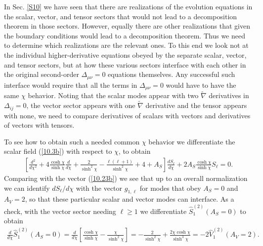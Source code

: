 \documentclass[aps,onecolumn,10pt]{revtex4}
\numberwithin{equation}{section}
\numberwithin{equation}{section}
\begin{document}
In Sec. \ref{S10} we have seen that there are realizations of the evolution equations in the scalar, vector, and tensor sectors that would not lead to a decomposition theorem in those sectors. However, equally there are other realizations that given the boundary conditions would lead to a decomposition theorem. Thus we need to determine which realizations are the relevant ones. To this end we look not at the individual higher-derivative equations obeyed by the separate scalar, vector, and tensor sectors, but at how these various sectors interface with each other in the original second-order $\Delta_{\mu\nu}=0$ equations themselves. Any successful such interface would require that all the terms in $\Delta_{\mu\nu}=0$ would have to have the same $\chi$ behavior. Noting that the scalar modes appear with two $\tilde{\nabla}$ derivatives in $\Delta_{ij}=0$, the vector sector appears with one $\tilde{\nabla}$ derivative and the tensor appears with none, we need to compare derivatives of scalars with vectors and derivatives of vectors with tensors. 

To see how to obtain such a needed common $\chi$ behavior we differentiate the scalar field (\ref{10.3b}) with respect to $\chi$, to obtain
%  
\begin{eqnarray}
 \left[\frac{d^2}{d\chi^2}+4\frac{\cosh\chi}{\sinh\chi}\frac{d }{ d\chi}
+\frac{2}{\sinh^2\chi}-\frac{\ell(\ell+1)}{\sinh^2\chi}+4+A_S\right]\frac{d S_{\ell}}{d \chi}
+2A_S\frac{\cosh\chi}{\sinh\chi}S_{\ell}=0.
\label{11.1}
\end{eqnarray}
%
Comparing with the vector (\ref{10.23b}) we see that up to an overall normalization we can identify $d S_{\ell}/d\chi$ with the vector $g_{1,\ell}$ for modes that obey $A_S=0$ and $A_V=2$, so that these particular scalar and vector modes can interface. As a check, with the vector sector needing $\ell \geq 1$ we differentiate $\hat{S}^{(2)}_1(A_S=0)$ to obtain
%  
\begin{eqnarray}
 \frac{d}{d \chi}\hat{S}^{(2)}_1(A_S=0) =\frac{d}{d \chi}\left[\frac{\cosh\chi}{\sinh\chi}-\frac{\chi}{\sinh^2\chi}\right]
 =-\frac{2}{ \sinh^2\chi}+\frac{2\chi\cosh\chi}{ \sinh^3\chi}=-2\hat{V}^{(2)}_1(A_V=2).
\label{11.2}
\end{eqnarray}
%
\end{document}
